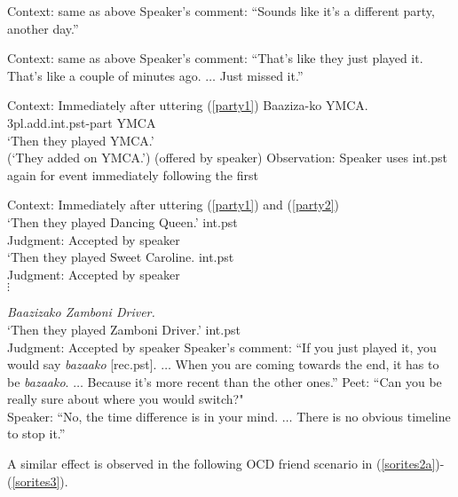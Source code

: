 \documentclass[output=paper,
modfonts
]{langscibook}
\begin{document}
\ea
\ea Context: same as above
\ex Speaker's comment: ``Sounds like it's a different party, another day.''
\z
\z

\ea
\ea Context: same as above
\ex Speaker's comment: ``That's like they just played it. That's like a couple of minutes ago. $\dots$ Just missed it.''
\z
\z

 
\ea\label{soritespartyfinal}
\ea Context: Immediately after uttering (\ref{party1})
\ex\label{party2}
 \gll Baaziza-ko YMCA. \\
{\sc 3pl}.add{\sc.int.pst-part} YMCA \\
\glt `Then they played YMCA.' \\
(`They added on YMCA.') \hfill (offered by speaker) 
\ex Observation: Speaker uses {\sc int.pst} again for event immediately following the first
\z
\z


\ea
\ea
 Context: Immediately after uttering (\ref{party1}) and (\ref{party2})
 \\
`Then they played Dancing Queen.' \hfill {\sc int.pst} \\
Judgment: Accepted by speaker
 \\
`Then they played Sweet Caroline. \hfill {\sc int.pst} \\
Judgment: Accepted by speaker \\
$\vdots$

\ex
 {\it Baazizako Zamboni Driver.} \\
`Then they played Zamboni Driver.' \hfill {\sc int.pst} \\
Judgment: Accepted by speaker
\ex Speaker's comment: ``If you just played it, you would say {\it bazaako} [{\sc rec.pst}]. $\dots$ When you are coming towards the end, it has to be {\it bazaako}. $\dots$ Because it's more recent than the other ones.'' 
\ex Peet: ``Can you be really sure about where you would switch?" \\
Speaker: ``No, the time difference is in your mind. $\dots$ There is no obvious timeline to stop it.''
\z
\z



A similar effect is observed in the following OCD friend scenario in (\ref{sorites2a})-(\ref{sorites3}).
\end{document}
